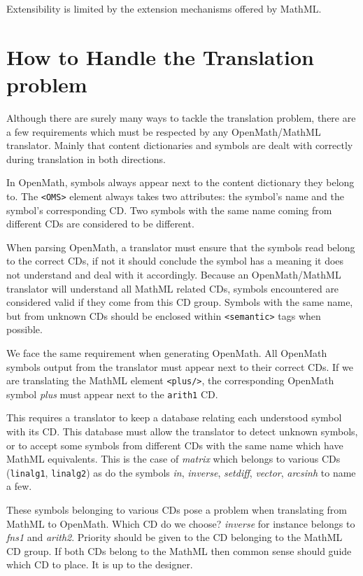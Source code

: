 Extensibility is limited by the extension mechanisms offered by MathML.

\section{How to Handle the Translation problem}

Although there are surely many ways to tackle the translation problem,
there are a few requirements which must be respected by any
OpenMath/MathML translator. Mainly that content dictionaries and
symbols are dealt with correctly during translation in both directions.

In OpenMath, symbols always appear next to the content
dictionary they belong to. The \verb|<OMS>|
element always takes two attributes: the symbol's name and the
symbol's corresponding CD. Two symbols with the same name coming from
different CDs are considered to be different.

When parsing OpenMath, a translator must ensure that the symbols read
belong to the correct CDs, if not it should conclude the symbol has a
meaning it does not understand and deal with it accordingly. Because
an OpenMath/MathML translator will understand all MathML related CDs,
symbols encountered are considered valid if they come from this CD
group. Symbols with the same name, but from unknown CDs should be
enclosed within \verb|<semantic>| tags when possible.

We face the same requirement when generating OpenMath. All OpenMath
symbols output from the translator must appear next to their correct
CDs. If we are translating the MathML element \verb|<plus/>|, the
corresponding OpenMath symbol {\it plus} must appear next to the
\verb|arith1| CD.

This requires a translator to keep a database relating each understood
symbol with its CD. This database must allow the translator to detect
unknown symbols, or to accept some symbols from different CDs with the
same name which have MathML equivalents. This is the case of {\it
matrix} which belongs to various CDs (\verb|linalg1|, \verb|linalg2|) as do
the symbols {\it in}, {\it inverse}, {\it setdiff}, {\it vector}, {\it
arcsinh} to name a few.

These symbols belonging to various CDs pose a problem when
translating from MathML to OpenMath. Which CD do we choose? {\it
inverse} for instance belongs to {\it fns1} and {\it arith2}.
Priority should be given to the CD belonging to the MathML CD group.
If both CDs belong to the MathML then common sense should guide which
CD to place. It is up to the designer.

